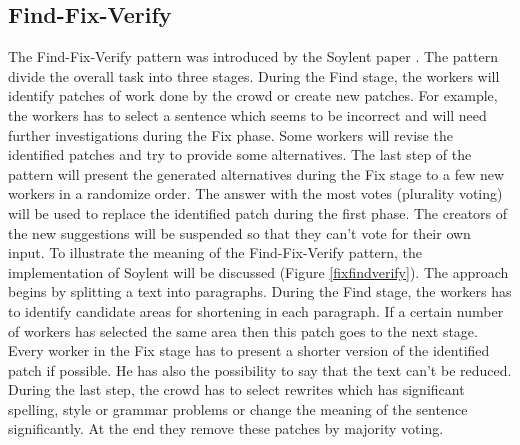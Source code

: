 \subsection{Find-Fix-Verify}
The Find-Fix-Verify pattern was introduced by the Soylent paper \cite{soylent}. The pattern divide the overall task into three stages. During the Find stage, the workers will identify patches of work done by the crowd or create new patches. For example, the workers has to select a sentence which seems to be incorrect and will need further investigations during the Fix phase. Some workers will revise the identified patches and try to provide some alternatives. The last step of the pattern will present the generated alternatives during the Fix stage to a few new workers in a randomize order. The answer with the most votes (plurality voting) will be used to replace the identified patch during the first phase. The creators of the new suggestions will be suspended so that they can't vote for their own input. To illustrate the meaning of the Find-Fix-Verify pattern, the implementation of Soylent will be discussed (Figure \ref{fixfindverify}). The approach begins by splitting a text into paragraphs. During the Find stage, the workers has to identify candidate areas for shortening in each paragraph. If a certain number of workers has selected the same area then this patch goes to the next stage. Every worker in the Fix stage has to present a shorter version of the identified patch if possible. He has also the possibility to say that the text can't be reduced. During the last step, the crowd has to select rewrites which has significant spelling, style or grammar problems or change the meaning of the sentence significantly. At the end they remove these patches by majority voting.
